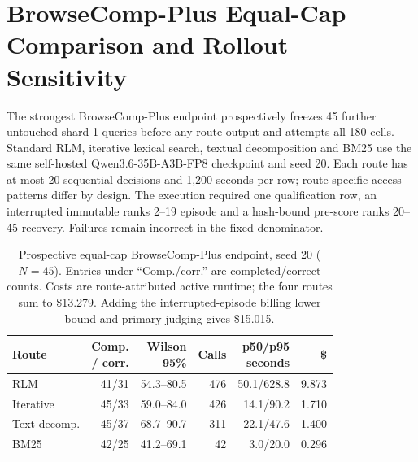 \FloatBarrier
\section{BrowseComp-Plus Equal-Cap Comparison and Rollout Sensitivity}
\label{app:stability}

The strongest BrowseComp-Plus endpoint prospectively freezes 45 further
untouched shard-1 queries before any route output and attempts all 180 cells.
Standard RLM, iterative lexical search, textual decomposition and BM25 use the
same self-hosted Qwen3.6-35B-A3B-FP8 checkpoint and seed 20. Each route has at
most 20 sequential decisions and 1,200 seconds per row; route-specific access
patterns differ by design. The execution required one qualification row, an
interrupted immutable ranks 2--19 episode and a hash-bound pre-score ranks
20--45 recovery. Failures remain incorrect in the fixed denominator.

\begin{table}[!htbp]
\centering
\small
\setlength{\tabcolsep}{1pt}
\begin{tabular}{@{}lrrrrr@{}}
\toprule
\textbf{Route} & \shortstack{\textbf{Comp.}\\\textbf{/ corr.}} &
\shortstack{\textbf{Wilson}\\\textbf{95\%}} & \textbf{Calls} &
\shortstack{\textbf{p50/p95}\\\textbf{seconds}} & \textbf{\$} \\
\midrule
RLM & 41/31 & 54.3--80.5 & 476 & 50.1/628.8 & 9.873 \\
Iterative & 45/33 & 59.0--84.0 & 426 & 14.1/90.2 & 1.710 \\
Text decomp. & 45/37 & 68.7--90.7 & 311 & 22.1/47.6 & 1.400 \\
BM25 & 42/25 & 41.2--69.1 & 42 & 3.0/20.0 & 0.296 \\
\bottomrule
\end{tabular}
\caption{Prospective equal-cap BrowseComp-Plus endpoint, seed 20 ($N=45$).
Entries under ``Comp./corr.'' are completed/correct counts. Costs are
route-attributed active runtime; the four routes sum to \$13.279. Adding the
interrupted-episode billing lower bound and primary judging gives \$15.015.}
\label{tab:supp-browsecomp-equal-cap-seed20}
\end{table}

